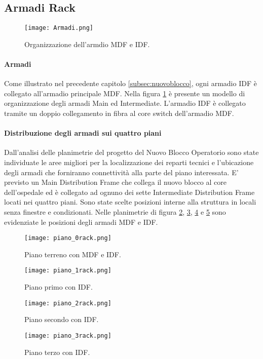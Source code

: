 \subsection{Armadi Rack}

\begin{figure}[h]
  \texttt{[image: Armadi.png]}
  \caption{Organizzazione dell'armdio MDF e IDF.}
  \label{fig:armadi}
\end{figure}

\paragraph{Armadi} Come illustrato nel precedente capitolo \ref{subsec:nuovoblocco}, ogni armadio IDF è collegato all'armadio principale MDF. Nella figura \ref{fig:armadi} è presente un modello di organizzazione degli armadi Main ed Intermediate. L'armadio IDF è collegato tramite un doppio collegamento in fibra al core switch dell'armadio MDF. 


\paragraph{Distribuzione degli armadi sui quattro piani} Dall'analisi delle planimetrie del progetto del Nuovo Blocco Operatorio sono state individuate le aree migliori per la localizzazione dei reparti tecnici e l'ubicazione degli armadi che forniranno connettività alla parte del piano interessata. E' previsto un Main Distribution Frame che collega il nuovo blocco al core dell'ospedale ed è collegato ad ognuno dei sette  Intermediate Distribution Frame locati nei quattro piani. Sono state scelte posizioni interne alla struttura in locali senza finestre e condizionati. Nelle planimetrie di figura \ref{fig:p0r}, \ref{fig:p1r}, \ref{fig:p2r} e \ref{fig:p3r} sono evidenziate le posizioni degli armadi MDF e IDF. 
\begin{figure}[h]
  \texttt{[image: piano\_0rack.png]}
  \caption{Piano terreno con MDF e IDF.}
  \label{fig:p0r}
\end{figure}\begin{figure}[h]
  \texttt{[image: piano\_1rack.png]}
  \caption{Piano primo con IDF.}
  \label{fig:p1r}
\end{figure}
\begin{figure}[h]
  \texttt{[image: piano\_2rack.png]}
  \caption{Piano secondo con IDF.}
  \label{fig:p2r}
\end{figure}
\begin{figure}[h]
  \texttt{[image: piano\_3rack.png]}
  \caption{Piano terzo con IDF.}
  \label{fig:p3r}
\end{figure}
